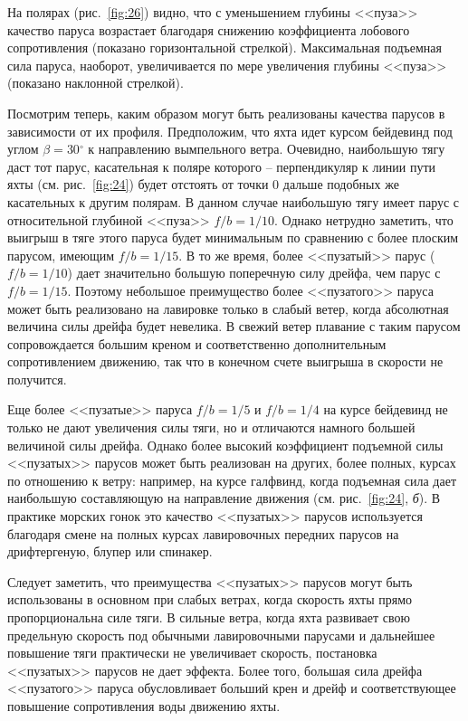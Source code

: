 \documentclass[a4paper, 12pt, twoside, final, book, russian, fittopage, cyremdash]{ncc}
\newcommand{\gr}{\ensuremath{^\circ}\xspace}
\newcommand{\ris}[1]{\ref{fig:#1}}
\begin{document}
На полярах (рис.~\ris{26}) видно, что с уменьшением глубины <<пуза>> качество паруса возрастает благодаря снижению коэффициента лобового сопротивления (показано горизонтальной стрелкой). Максимальная подъемная сила паруса, наоборот, увеличивается по мере увеличения глубины <<пуза>> (показано наклонной стрелкой).

Посмотрим теперь, каким образом могут быть реализованы качества парусов в зависимости от их профиля. Предположим, что яхта идет курсом бейдевинд под углом $\beta = 30\gr$ к направлению вымпельного ветра. Очевидно, наибольшую тягу даст тот парус, касательная к поляре которого \--- перпендикуляр к линии пути яхты (см. рис.~\ris{24}) будет отстоять от точки 0 дальше подобных же касательных к другим полярам. В данном случае наибольшую тягу имеет парус с относительной глубиной <<пуза>> $f/b=1/10$. Однако нетрудно заметить, что выигрыш в тяге этого паруса будет минимальным по сравнению с более плоским парусом, имеющим $f/b = 1/15$. В то же время, более <<пузатый>> парус ($f/b = 1/10$) дает значительно большую поперечную силу дрейфа, чем парус с $f/b = 1/15$. Поэтому небольшое преимущество более <<пузатого>> паруса может быть реализовано на лавировке только в слабый ветер, когда абсолютная величина силы дрейфа будет невелика. В свежий ветер плавание с таким парусом сопровождается большим креном и соответственно дополнительным сопротивлением движению, так что в конечном счете выигрыша в скорости не получится. 

Еще более <<пузатые>> паруса $f/b=1/5$ и $f/b=1/4$ на курсе бейдевинд не только не дают увеличения силы тяги, но и отличаются намного большей величиной силы дрейфа. Однако более высокий коэффициент подъемной силы <<пузатых>> парусов может быть реализован на других, более полных, курсах по отношению к ветру: например, на курсе галфвинд, когда подъемная сила дает наибольшую составляющую на направление движения (см. рис.~\ris{24}, \textit{б}). В практике морских гонок это качество <<пузатых>> парусов используется благодаря смене на полных курсах лавировочных передних парусов на дрифтергеную, блупер или спинакер.

Следует заметить, что преимущества <<пузатых>> парусов могут быть использованы в основном при слабых ветрах, когда скорость яхты прямо пропорциональна силе тяги. В сильные ветра, когда яхта развивает свою предельную скорость под обычными лавировочными парусами и дальнейшее повышение тяги практически не увеличивает скорость, постановка <<пузатых>> парусов не дает эффекта. Более того, большая сила дрейфа <<пузатого>> паруса обусловливает больший крен и дрейф и соответствующее повышение сопротивления воды движению яхты. 
\end{document}
